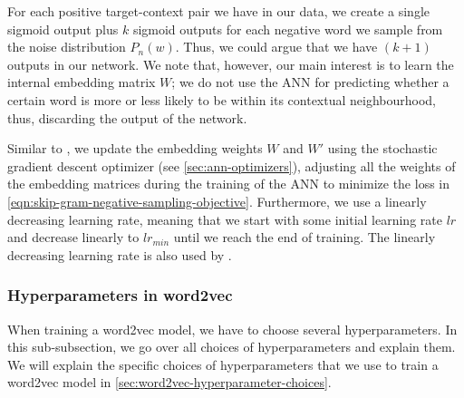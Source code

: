 For each positive target-context pair we have in our data, we create a single sigmoid output plus $k$ sigmoid outputs for each negative word we sample from the noise distribution $P_n(w)$. Thus, we could argue that we have $(k + 1)$ outputs in our network.  We note that, however, our main interest is to learn the internal embedding matrix $W$; we do not use the ANN for predicting whether a certain word is more or less likely to be within its contextual neighbourhood, thus, discarding the output of the network.

Similar to \cite{mikolov2013a}, we update the embedding weights $W$ and $W'$ using the stochastic gradient descent optimizer (see \cref{sec:ann-optimizers}), adjusting all the weights of the embedding matrices during the training of the ANN to minimize the loss in \cref{eqn:skip-gram-negative-sampling-objective}. Furthermore, we use a linearly decreasing learning rate, meaning that we start with some initial learning rate $lr$ and decrease linearly to $lr_{min}$ until we reach the end of training. The linearly decreasing learning rate is also used by \cite{mikolov2013a}.

\subsubsection{Hyperparameters in word2vec}
When training a word2vec model, we have to choose several hyperparameters. In this sub-subsection, we go over all choices of hyperparameters and explain them. We will explain the specific choices of hyperparameters that we use to train a word2vec model in \cref{sec:word2vec-hyperparameter-choices}.

